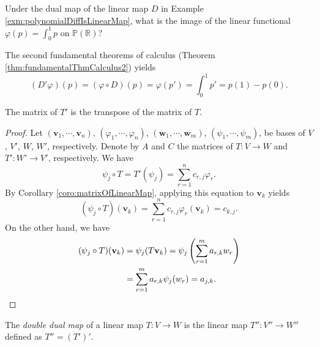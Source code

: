 \begin{exc}
  Under the dual map of the linear map $D$
   in Example \ref{exm:polynomialDiffIsLinearMap}, 
  what is the image of
   the linear functional $\varphi(p)=\int_0^1 p$
   on $\mathbb{P}(\mathbb{R})$?   
\end{exc}
\begin{solution}
  The second fundamental theorems of calculus
  (Theorem \ref{thm:fundamentalThmCalculus2}) yields
  \begin{displaymath}
     (D' \varphi)(p) = (\varphi\circ D)(p)
     = \varphi(p') = \int_0^1 p' = p(1) - p(0).
  \end{displaymath}
\end{solution}

\begin{thm}
  \label{thm:matrixOfDualMap}
  The matrix of $T'$ is the transpose of the matrix of $T$.
\end{thm}
\begin{proof}
  Let $(\mathbf{v}_1, \cdots, \mathbf{v}_n)$,
   $(\varphi_1, \cdots, \varphi_n)$,
   $(\mathbf{w}_1, \cdots, \mathbf{w}_m)$,
   $(\psi_1, \cdots, \psi_m)$,
   be bases of $V$, $V'$, $W$, $W'$,
   respectively.
  Denote by $A$ and $C$ the matrices of $T: V\rightarrow W$
   and $T': W'\rightarrow V'$,
   respectively.
  We have
  \begin{displaymath}
    \psi_j\circ T = T'(\psi_j) = \sum_{r=1}^n c_{r,j} \varphi_r.
  \end{displaymath}
  By Corollary \ref{coro:matrixOfLinearMap},
   applying this equation to $\mathbf{v}_k$ yields
  \begin{displaymath}
    (\psi_j\circ T)(\mathbf{v}_k)
    = \sum_{r=1}^n c_{r,j} \varphi_r (\mathbf{v}_k)
    = c_{k,j}.
  \end{displaymath}
  On the other hand, we have
  \begin{align*}
    (\psi_j\circ T)(\mathbf{v}_k)
    &= \psi_j(T \mathbf{v}_k)
    = \psi_j\left(\sum_{r=1}^m a_{r,k} w_r \right)
    \\
    &= \sum_{r=1}^m a_{r,k} \psi_j(w_r)
    = a_{j,k}. \qedhere
  \end{align*}
\end{proof}

\begin{defn}
  \label{def:doubleDualMap}
  The \emph{double dual map} of a linear map $T: V\rightarrow W$
   is the linear map $T'': V''\rightarrow W''$
   defined as $T'' = (T')'$.
\end{defn}

